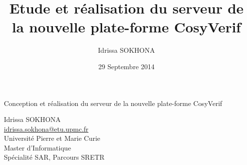 \documentclass[t, english]{beamer}
\begin{document}
\title{Etude et réalisation du serveur de la nouvelle plate-forme CosyVerif}
\author{Idrissa SOKHONA}
\date{29 Septembre 2014}

\begin{frame}
\begin{center}
\Huge Conception et réalisation du serveur de la nouvelle plate-forme CosyVerif

\par\vfill
\normalsize
\textsf{%
Idrissa SOKHONA \\
\url{idrissa.sokhona@etu.upmc.fr} \\
Université Pierre et Marie Curie \\
Master d'Informatique \\
Spécialité SAR, Parcours SRETR
}
\par\vfill
{}
\end{center}
\end{frame}
\end{document}
